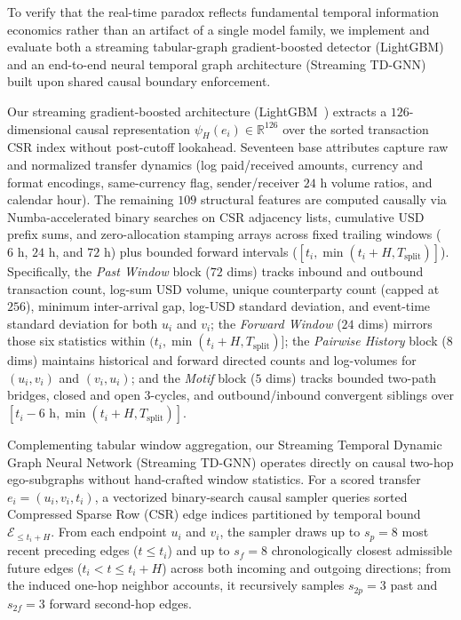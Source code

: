 \documentclass[pdflatex,sn-mathphys,Numbered]{sn-jnl}
\theoremstyle{thmstyleone}
\begin{document}
To verify that the real-time paradox reflects fundamental temporal information economics rather than an artifact of a single model family, we implement and evaluate both a streaming tabular-graph gradient-boosted detector (LightGBM) and an end-to-end neural temporal graph architecture (Streaming TD-GNN) built upon shared causal boundary enforcement.

Our streaming gradient-boosted architecture (LightGBM~\cite{ke2017lightgbm}) extracts a $126$-dimensional causal representation $\psi_H(e_i) \in \mathbb{R}^{126}$ over the sorted transaction CSR index without post-cutoff lookahead. Seventeen base attributes capture raw and normalized transfer dynamics (log paid/received amounts, currency and format encodings, same-currency flag, sender/receiver $24\text{ h}$ volume ratios, and calendar hour). The remaining $109$ structural features are computed causally via Numba-accelerated binary searches on CSR adjacency lists, cumulative USD prefix sums, and zero-allocation stamping arrays across fixed trailing windows ($6\text{ h}$, $24\text{ h}$, and $72\text{ h}$) plus bounded forward intervals ($[t_i, \min(t_i + H, T_{\text{split}})]$). Specifically, the \emph{Past Window} block ($72$ dims) tracks inbound and outbound transaction count, log-sum USD volume, unique counterparty count (capped at $256$), minimum inter-arrival gap, log-USD standard deviation, and event-time standard deviation for both $u_i$ and $v_i$; the \emph{Forward Window} ($24$ dims) mirrors those six statistics within $(t_i, \min(t_i + H, T_{\text{split}})]$; the \emph{Pairwise History} block ($8$ dims) maintains historical and forward directed counts and log-volumes for $(u_i, v_i)$ and $(v_i, u_i)$; and the \emph{Motif} block ($5$ dims) tracks bounded two-path bridges, closed and open $3$-cycles, and outbound/inbound convergent siblings over $[t_i - 6\text{ h}, \min(t_i + H, T_{\text{split}})]$.

Complementing tabular window aggregation, our Streaming Temporal Dynamic Graph Neural Network (Streaming TD-GNN) operates directly on causal two-hop ego-subgraphs without hand-crafted window statistics. For a scored transfer $e_i = (u_i, v_i, t_i)$, a vectorized binary-search causal sampler queries sorted Compressed Sparse Row (CSR) edge indices partitioned by temporal bound $\mathcal{E}_{\le t_i + H}$. From each endpoint $u_i$ and $v_i$, the sampler draws up to $s_p = 8$ most recent preceding edges ($t \le t_i$) and up to $s_f = 8$ chronologically closest admissible future edges ($t_i < t \le t_i + H$) across both incoming and outgoing directions; from the induced one-hop neighbor accounts, it recursively samples $s_{2p} = 3$ past and $s_{2f} = 3$ forward second-hop edges.
\end{document}
